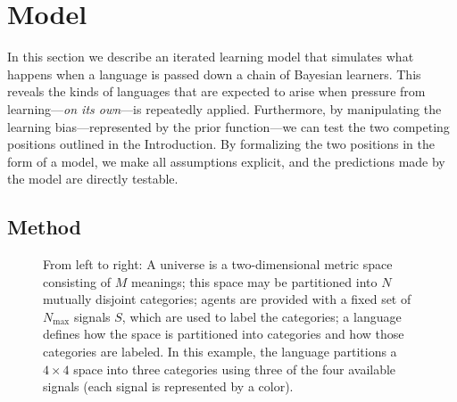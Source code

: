 \documentclass[doc,biblatex]{apa7}
\begin{document}
\section{Model}

In this section we describe an iterated learning model that simulates what happens when a language is passed down a chain of Bayesian learners. This reveals the kinds of languages that are expected to arise when pressure from learning---\textit{on its own}---is repeatedly applied. Furthermore, by manipulating the learning bias---represented by the prior function---we can test the two competing positions outlined in the Introduction. By formalizing the two positions in the form of a model, we make all assumptions explicit, and the predictions made by the model are directly testable.

\subsection{Method}

	\begin{figure}
	\vspace*{2pt}
	\caption{From left to right: A universe is a two-dimensional metric space consisting of $M$ meanings; this space may be partitioned into $N$ mutually disjoint categories; agents are provided with a fixed set of $N_\mathrm{max}$ signals $S$, which are used to label the categories; a language defines how the space is partitioned into categories and how those categories are labeled. In this example, the language partitions a $4 \times 4$ space into three categories using three of the four available signals (each signal is represented by a color).}
	\label{fig01}
	\end{figure}
\end{document}
